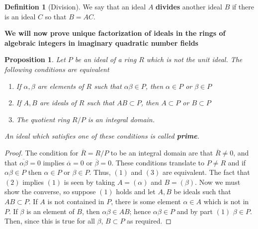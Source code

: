 \documentclass[12pt]{article}
\newtheorem{prop}[thm]{Proposition}
\theoremstyle{definition}
\newtheorem{defn}[thm]{Definition}
\theoremstyle{remark}
\numberwithin{equation}{section}
\newcommand\B[1]{\textbf{ #1}}
\begin{document}
\vspace{15pt}

\begin{defn}[Division]
        We say that an ideal $A$ \B{divides} another ideal $B$ if there is an ideal $C$ so that $B=AC$.
\end{defn}

\vspace{15pt}

\textbf{We will now prove unique factorization of ideals in the rings of algebraic integers in imaginary quadratic number fields}

\vspace{15pt}

\begin{prop}
        Let $P$ be an ideal of a ring $R$ which is not the unit ideal. The following conditions are equivalent \begin{enumerate}
                \item If $\alpha,\beta$ are elements of $R$ such that $\alpha\beta \in P$, then $\alpha \in P$ or $\beta \in P$
                \item If $A,B$ are ideals of $R$ such that $AB \subset P$, then $A \subset P$ or $B \subset P$
                \item The quotient ring $R/P$ is an integral domain.
        \end{enumerate}
        An ideal which satisfies one of these conditions is called \B{prime}.
\end{prop}
\begin{proof}
        The condition for $\overline{R} = R/P$ to be an integral domain are that $\overline{R} \neq 0$, and that $\overline{\alpha\beta} = 0$ implies $\overline{\alpha} = 0$ or $\overline{\beta} = 0$. These conditions translate to $P \neq R$ and if $\alpha\beta \in P$ then $\alpha\in P$ or $\beta \in P$. Thus, $(1)$ and $(3)$ are equivalent. The fact that $(2)$ implies $(1)$ is seen by taking $A = (\alpha)$ and $B = (\beta)$. Now we must show the converse, so suppose $(1)$ holds and let $A,B$ be ideals such that $AB \subset P$. If $A$ is not contained in $P$, there is some element $\alpha \in A$ which is not in $P$. If $\beta$ is an element of $B$, then $\alpha\beta \in AB$; hence $\alpha\beta \in P$ and by part $(1)$ $\beta \in P$. Then, since this is true for all $\beta$, $B \subset P$ as required.
\end{proof}



\vspace{15pt}
\end{document}
